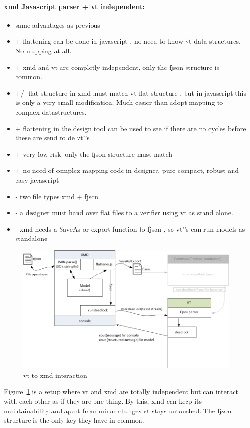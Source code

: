 \documentclass[a4paper,11pt,final]{article}
\begin{document}
\paragraph{xmd Javascript parser + vt independent:}
\begin{itemize}
\item same advantages as previous
\item + flattening can be done in javascript , no need to know vt data structures.  No mapping at all.
\item + xmd and vt are completly independent, only the fjson structure is common.
\item +/- flat structure in xmd must match vt flat structure , but in javascript this is only a
	very small modification. Much easier than adopt mapping to complex datastructures.
\item + flattening in the design tool can be used to see if there are no cycles before these are send to de vt'’s
\item + very low risk, only the fjson structure must match
\item + no need of complex mapping code in designer, pure compact, robust and easy javascript
\item - two file types xmd + fjson
\item - a designer must hand over flat files to a verifier using vt as stand alone.
\item - xmd needs a SaveAs or export function to fjson , so vt'’s can run models as standalone
\end{itemize}


\begin{figure}[here]
\includegraphics[width=1.0\textwidth]{xmd2vt}
\caption{vt to xmd interaction}
\label{fig:xmd2vt}
\end{figure}
Figure~\ref{fig:xmd2vt} is a setup where vt and xmd are totally independent
but can interact with each other as if they are one thing. By this, xmd can keep
its maintainability and apart from minor changes vt stays untouched.
The fjson structure is the only key they have in common.
\end{document}
